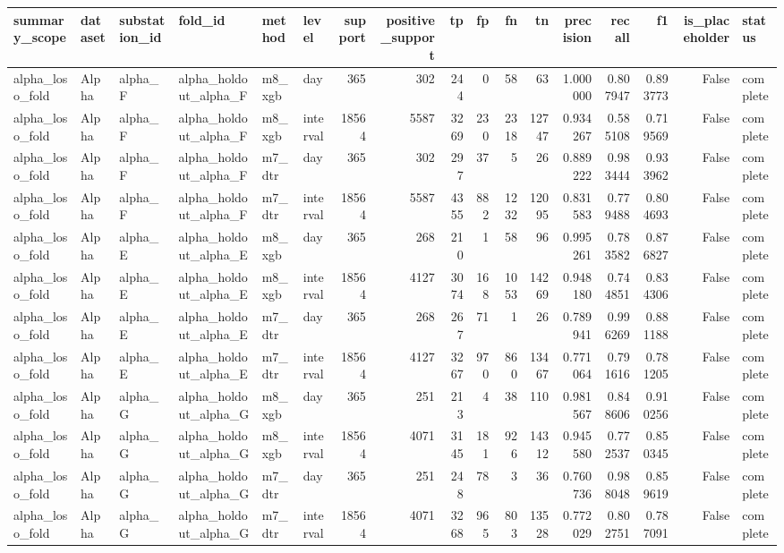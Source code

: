 \begin{tabular}{llllllrrrrrrrrrrl}
\toprule
summary_scope & dataset & substation_id & fold_id & method & level & support & positive_support & tp & fp & fn & tn & precision & recall & f1 & is_placeholder & status \\
\midrule
alpha_loso_fold & Alpha & alpha_F & alpha_holdout_alpha_F & m8_xgb & day & 365 & 302 & 244 & 0 & 58 & 63 & 1.000000 & 0.807947 & 0.893773 & False & complete \\
alpha_loso_fold & Alpha & alpha_F & alpha_holdout_alpha_F & m8_xgb & interval & 18564 & 5587 & 3269 & 230 & 2318 & 12747 & 0.934267 & 0.585108 & 0.719569 & False & complete \\
alpha_loso_fold & Alpha & alpha_F & alpha_holdout_alpha_F & m7_dtr & day & 365 & 302 & 297 & 37 & 5 & 26 & 0.889222 & 0.983444 & 0.933962 & False & complete \\
alpha_loso_fold & Alpha & alpha_F & alpha_holdout_alpha_F & m7_dtr & interval & 18564 & 5587 & 4355 & 882 & 1232 & 12095 & 0.831583 & 0.779488 & 0.804693 & False & complete \\
alpha_loso_fold & Alpha & alpha_E & alpha_holdout_alpha_E & m8_xgb & day & 365 & 268 & 210 & 1 & 58 & 96 & 0.995261 & 0.783582 & 0.876827 & False & complete \\
alpha_loso_fold & Alpha & alpha_E & alpha_holdout_alpha_E & m8_xgb & interval & 18564 & 4127 & 3074 & 168 & 1053 & 14269 & 0.948180 & 0.744851 & 0.834306 & False & complete \\
alpha_loso_fold & Alpha & alpha_E & alpha_holdout_alpha_E & m7_dtr & day & 365 & 268 & 267 & 71 & 1 & 26 & 0.789941 & 0.996269 & 0.881188 & False & complete \\
alpha_loso_fold & Alpha & alpha_E & alpha_holdout_alpha_E & m7_dtr & interval & 18564 & 4127 & 3267 & 970 & 860 & 13467 & 0.771064 & 0.791616 & 0.781205 & False & complete \\
alpha_loso_fold & Alpha & alpha_G & alpha_holdout_alpha_G & m8_xgb & day & 365 & 251 & 213 & 4 & 38 & 110 & 0.981567 & 0.848606 & 0.910256 & False & complete \\
alpha_loso_fold & Alpha & alpha_G & alpha_holdout_alpha_G & m8_xgb & interval & 18564 & 4071 & 3145 & 181 & 926 & 14312 & 0.945580 & 0.772537 & 0.850345 & False & complete \\
alpha_loso_fold & Alpha & alpha_G & alpha_holdout_alpha_G & m7_dtr & day & 365 & 251 & 248 & 78 & 3 & 36 & 0.760736 & 0.988048 & 0.859619 & False & complete \\
alpha_loso_fold & Alpha & alpha_G & alpha_holdout_alpha_G & m7_dtr & interval & 18564 & 4071 & 3268 & 965 & 803 & 13528 & 0.772029 & 0.802751 & 0.787091 & False & complete \\

\end{tabular}

